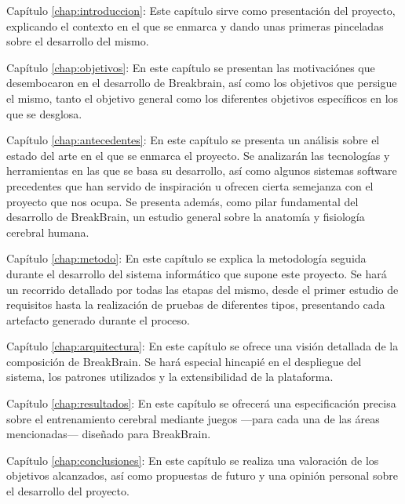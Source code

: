 \begin{definitionlist}

\item [Capítulo \ref{chap:introduccion}: \nameref{chap:introduccion}] Este capítulo sirve como presentación del proyecto, explicando el contexto en el que se enmarca y dando unas primeras pinceladas sobre el desarrollo del mismo.

\item [Capítulo \ref{chap:objetivos}: \nameref{chap:objetivos}] En este capítulo se presentan las motivaciónes que desembocaron en el desarrollo de Breakbrain, así como los objetivos que persigue el mismo, tanto el objetivo general como los diferentes objetivos específicos en los que se desglosa.

\item [Capítulo \ref{chap:antecedentes}: \nameref{chap:antecedentes}] En este capítulo se presenta un análisis sobre el estado del arte en el que se enmarca el proyecto. Se analizarán las tecnologías y herramientas en las que se basa su desarrollo, así como algunos sistemas software precedentes que han servido de inspiración u ofrecen cierta semejanza con el proyecto que nos ocupa. Se presenta además, como pilar fundamental del desarrollo de BreakBrain, un estudio general sobre la anatomía y fisiología cerebral humana.

\item [Capítulo \ref{chap:metodo}: \nameref{chap:metodo}] En este capítulo se explica la metodología seguida durante el desarrollo del sistema informático que supone este proyecto. Se hará un recorrido detallado por todas las etapas del mismo, desde el primer estudio de requisitos hasta la realización de pruebas de diferentes tipos, presentando cada artefacto generado durante el proceso.

\item [Capítulo \ref{chap:arquitectura}: \nameref{chap:arquitectura}] En este capítulo se ofrece una visión detallada de la composición de BreakBrain. Se hará especial hincapié en el despliegue del sistema, los patrones utilizados y la extensibilidad de la plataforma.

\item [Capítulo \ref{chap:resultados}: \nameref{chap:resultados}] En este capítulo se ofrecerá una especificación precisa sobre el entrenamiento cerebral mediante juegos ---para cada una de las áreas mencionadas--- diseñado para BreakBrain.

\item [Capítulo \ref{chap:conclusiones}: \nameref{chap:conclusiones}] En este capítulo se realiza una valoración de los objetivos alcanzados, así como propuestas de futuro y una opinión personal sobre el desarrollo del proyecto.


\end{definitionlist}
